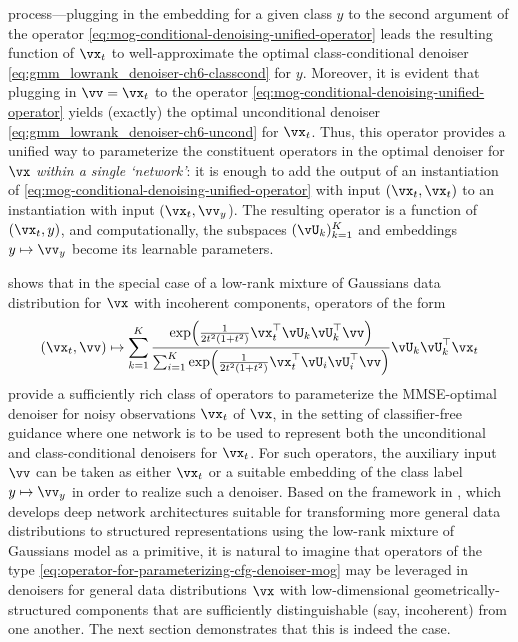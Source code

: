\documentclass[../../book-main.tex]{subfiles}
\begin{document}
\begin{example}
  process---plugging in the embedding for a given class $y$ to the second
  argument of the operator \eqref{eq:mog-conditional-denoising-unified-operator}
  leads the resulting function of $\vx_t$ to well-approximate the optimal
  class-conditional denoiser \eqref{eq:gmm_lowrank_denoiser-ch6-classcond} for
  $y$. Moreover, it is evident that plugging in $\vv = \vx_t$ to the operator
  \eqref{eq:mog-conditional-denoising-unified-operator} yields (exactly) the
  optimal unconditional denoiser \eqref{eq:gmm_lowrank_denoiser-ch6-uncond} for $\vx_t$.
  Thus, this operator provides a unified way to parameterize the constituent
  operators in the optimal denoiser for $\vx$ \textit{within a single
  `network'}: it is enough to add the output of an instantiation of
  \eqref{eq:mog-conditional-denoising-unified-operator} with input $(\vx_t,
  \vx_t)$ to an instantiation with input $(\vx_t, \vv_y$). The resulting
  operator is a function of $(\vx_t, y)$, and computationally, the subspaces
  $(\vU_k)_{k=1}^K$ and embeddings $y \mapsto \vv_y$ become its learnable
  parameters.
\end{example}

 shows that in the special case of
a low-rank mixture of Gaussians data distribution for $\vx$ with incoherent
components, operators of the form
\begin{equation}\label{eq:operator-for-parameterizing-cfg-denoiser-mog}
  (\vx_t, \vv) \mapsto
  \sum_{k = 1}^{K}\frac{
    \exp\rp{\frac{1}{2t^{2}(1
    + t^{2})}\vx_t^\top \vU_k \vU_k^\top \vv}
  }
  {
    \sum_{i
    = 1}^{K}\exp\rp{\frac{1}{2t^{2}(1
    + t^{2})}\vx_t^\top \vU_i \vU_i^\top \vv}
  }
  \vU_{k}\vU_{k}^{\top}\vx_t
\end{equation}
provide a sufficiently rich class of operators to parameterize the MMSE-optimal
denoiser for noisy observations $\vx_t$ of $\vx$, in the setting of
classifier-free guidance where one network is to be used to represent both the
unconditional and class-conditional denoisers for $\vx_t$. For such operators,
the auxiliary input $\vv$ can be taken as either $\vx_t$ or a suitable embedding
of the class label $y \mapsto \vv_y$ in order to realize such a denoiser.
Based on the framework in , which develops deep network
architectures suitable for transforming more general data distributions to
structured representations using the low-rank mixture of Gaussians model as
a primitive, it is natural to imagine that operators of the type
\eqref{eq:operator-for-parameterizing-cfg-denoiser-mog} may be leveraged in
denoisers for
general data distributions $\vx$ with low-dimensional geometrically-structured
components that are sufficiently distinguishable (say, incoherent) from one
another.
The next section demonstrates that this is indeed the case.
\end{document}
